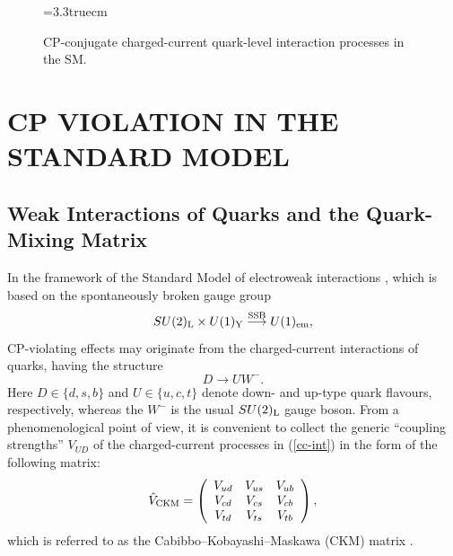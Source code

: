 \documentclass[12pt]{article}
\begin{document}
\begin{figure}
\centerline{
\epsfysize=3.3truecm
}
\caption{CP-conjugate charged-current quark-level interaction processes
in the SM.}\label{fig:CC} 
\end{figure}



%
%
%
\section{CP VIOLATION IN THE STANDARD MODEL}\label{sec:CP-SM}
\setcounter{equation}{0}
%
%
%
\subsection{Weak Interactions of Quarks and the Quark-Mixing Matrix}
%
%
%
In the framework of the Standard Model of electroweak interactions 
\cite{buchmueller,SM}, which is based on the spontaneously broken gauge group
\begin{equation}
SU(2)_{\rm L}\times U(1)_{\rm Y}
\stackrel{{\rm SSB}}
{\longrightarrow}U(1)_{\rm em},
\end{equation}
CP-violating effects may originate from the charged-current 
interactions of quarks, having the structure
\begin{equation}\label{cc-int}
D\to U W^-.
\end{equation}
Here $D\in\{d,s,b\}$ and $U\in\{u,c,t\}$ denote down- and up-type quark 
flavours, respectively, whereas the $W^-$ is the usual $SU(2)_{\rm L}$ 
gauge boson. From a phenomenological point of view, it is convenient to 
collect the generic ``coupling strengths'' $V_{UD}$ of the charged-current 
processes in (\ref{cc-int}) in the form of the following matrix:
\begin{equation}\label{ckm0}
\hat V_{\rm CKM}=
\left(\begin{array}{ccc}
V_{ud}&V_{us}&V_{ub}\\
V_{cd}&V_{cs}&V_{cb}\\
V_{td}&V_{ts}&V_{tb}
\end{array}\right),
\end{equation}
which is referred to as the Cabibbo--Kobayashi--Maskawa (CKM) matrix
\cite{cab,KM}. 
\end{document}
